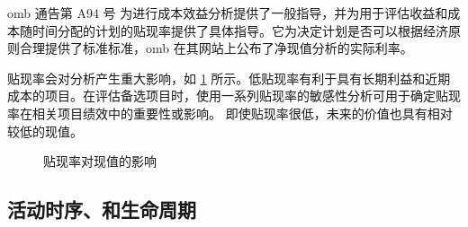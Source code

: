 \acrfull*{omb} 通告第 A94 号 \cite{omb1992} 为进行成本效益分析提供了一般指导，并为用于评估收益和成本随时间分配的计划的贴现率提供了具体指导。它为决定计划是否可以根据经济原则合理提供了标准标准，\acrshort*{omb} 在其网站上公布了净现值分析的实际利率。

贴现率会对分析产生重大影响，如 \cref{fig:effect-discount-rates} 所示。低贴现率有利于具有长期利益和近期成本的项目。在评估备选项目时，使用一系列贴现率的敏感性分析可用于确定贴现率在相关项目绩效中的重要性或影响。 即使贴现率很低，未来的价值也具有相对较低的现值。

\begin{figure}
  \caption{贴现率对现值的影响}
  \label{fig:effect-discount-rates}
\end{figure}

\subsection{活动时序、和生命周期}

